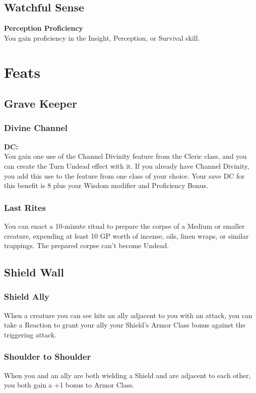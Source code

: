 \documentclass[letterpaper,openany,oneside,twocolumn]{book}
\begin{document}
\subsection*{Watchful Sense}
\textbf{Perception Proficiency}\\
You gain proficiency in the Insight, Perception, or Survival skill.

\section*{Feats}
\subsection*{Grave Keeper}
\subsubsection*{Divine Channel}
\textbf{DC: }\\
You gain one use of the Channel Divinity feature from the Cleric class, and you can create the Turn Undead effect with it. If you already have Channel Divinity, you add this use to the feature from one class of your choice. Your save DC for this benefit is 8 plus your Wisdom modifier and Proficiency Bonus.
\subsubsection*{Last Rites}
You can enact a 10-minute ritual to prepare the corpse of a Medium or smaller creature, expending at least 10 GP worth of incense, oils, linen wraps, or similar trappings. The prepared corpse can't become Undead.
\subsection*{Shield Wall}
\subsubsection*{Shield Ally}
When a creature you can see hits an ally adjacent to you with an attack, you can take a Reaction to grant your ally your Shield's Armor Class bonus against the triggering attack.
\subsubsection*{Shoulder to Shoulder}
When you and an ally are both wielding a Shield and are adjacent to each other, you both gain a +1 bonus to Armor Class.
\end{document}
